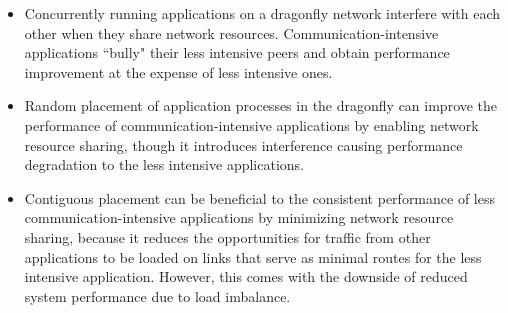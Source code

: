 


\begin{itemize}
   
    \item Concurrently running applications on a dragonfly network interfere with each other when they share network resources. Communication-intensive applications ``bully" their less intensive peers and obtain performance improvement at the expense of less intensive ones. 
    
    \item Random placement of application processes in the dragonfly can improve the performance of communication-intensive applications by enabling network resource sharing, though it introduces interference causing performance degradation to the less intensive applications.
    
   \item Contiguous placement can be beneficial to the consistent performance of less communication-intensive applications by minimizing network resource sharing, because it reduces the opportunities for traffic from other applications to be loaded on links that serve as minimal routes for the less intensive application. However, this comes with the downside of reduced system performance due to load imbalance.
    
    
\end{itemize}


